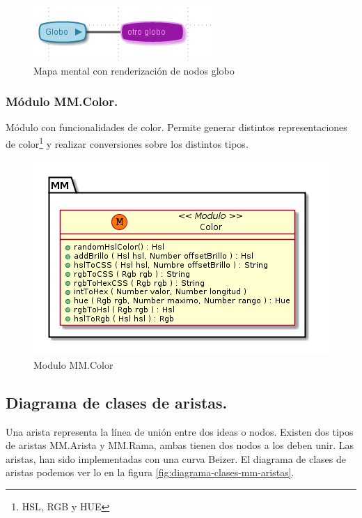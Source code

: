 \begin{figure}[tbph]
\centering
\includegraphics[width=0.3\linewidth]{imagenes/NodoGlobo}
\caption{Mapa mental con renderización de nodos globo}
\label{fig:nodoglobo}
\end{figure}

\subsubsection{Módulo MM.Color.}
Módulo con funcionalidades de color. Permite generar distintos representaciones de color\footnote{HSL, RGB y HUE} y realizar conversiones sobre los distintos tipos. 

\begin{figure}[tbph]
\centering
\includegraphics[width=0.5\linewidth]{imagenes/diagrama-clase-mm-color}
\caption{Modulo MM.Color}
\label{fig:diagrama-clase-mm-color}
\end{figure}



\subsection{Diagrama de clases de aristas.}
Una arista representa la línea de unión entre dos ideas o nodos. Existen dos tipos de aristas MM.Arista y MM.Rama, ambas tienen dos nodos a los deben unir. Las aristas, han sido implementadas con una curva Beizer. El diagrama de clases de aristas podemos ver lo en la figura \ref{fig:diagrama-clases-mm-aristas}.

